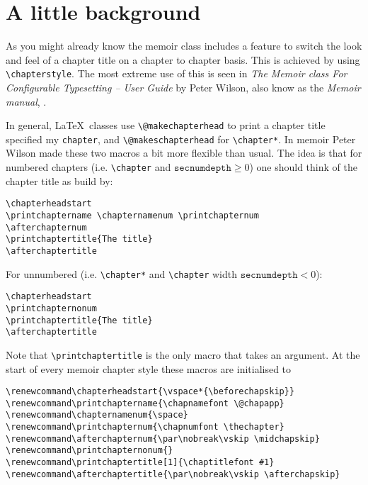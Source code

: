 \newpage

\chapter{A little background}
\label{cha:little-background}

As you might already know the memoir class includes a feature to
switch the look and feel of a chapter title on a chapter to chapter
basis. This is achieved by using \verb+\chapterstyle+. The
most extreme use of this is seen in \emph{The Memoir class For
  Configurable Typesetting -- User Guide} by Peter Wilson, also know
as the \emph{Memoir manual}, \cite{memman}.


In general, \LaTeX\ classes use \verb+\@makechapterhead+ to print a
chapter title specified my \verb|chapter|, and
\verb+\@makeschapterhead+ for \verb+\chapter*+. In memoir Peter Wilson
made these two macros a bit more flexible than usual. The idea is
that for numbered chapters (i.e. \verb+\chapter+ and
$\texttt{secnumdepth}\geq 0$) one should think of the chapter title as
build by:
\begin{Verbatim}
\chapterheadstart
\printchaptername \chapternamenum \printchapternum
\afterchapternum
\printchaptertitle{The title}  
\afterchaptertitle
\end{Verbatim}
For unnumbered (i.e. \verb+\chapter*+ and \verb+\chapter+ width
$\texttt{secnumdepth}<0$): 
\begin{Verbatim}
\chapterheadstart
\printchapternonum
\printchaptertitle{The title}
\afterchaptertitle  
\end{Verbatim}
Note that \verb+\printchaptertitle+ is the only macro that takes an
argument. At the start of every memoir chapter style these macros are
initialised to
\begin{Verbatim}
\renewcommand\chapterheadstart{\vspace*{\beforechapskip}}
\renewcommand\printchaptername{\chapnamefont \@chapapp}
\renewcommand\chapternamenum{\space}
\renewcommand\printchapternum{\chapnumfont \thechapter}
\renewcommand\afterchapternum{\par\nobreak\vskip \midchapskip}
\renewcommand\printchapternonum{}
\renewcommand\printchaptertitle[1]{\chaptitlefont #1}
\renewcommand\afterchaptertitle{\par\nobreak\vskip \afterchapskip}
\end{Verbatim}
